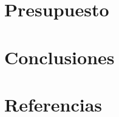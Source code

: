 \documentclass[12pt]{article}
\begin{document}

\section{Presupuesto}










\section{Conclusiones}

\setcounter{secnumdepth}{0}
\section{Referencias}
\printbibliography[heading=none]
\end{document}

